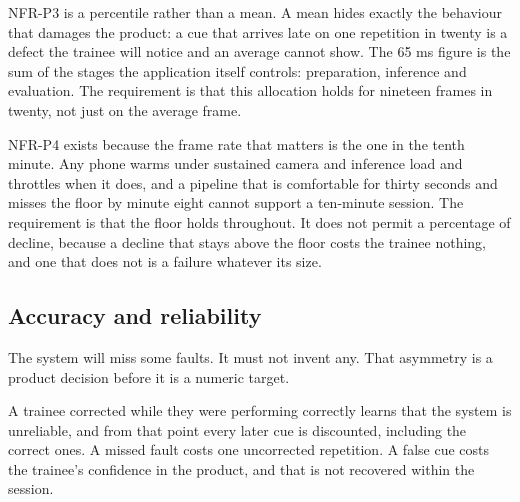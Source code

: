 NFR-P3 is a percentile rather than a mean. A mean hides exactly the behaviour that damages the product: a cue that arrives late on one repetition in twenty is a defect the trainee will notice and an average cannot show. The 65 ms figure is the sum of the stages the application itself controls: preparation, inference and evaluation. The requirement is that this allocation holds for nineteen frames in twenty, not just on the average frame.

NFR-P4 exists because the frame rate that matters is the one in the tenth minute. Any phone warms under sustained camera and inference load and throttles when it does, and a pipeline that is comfortable for thirty seconds and misses the floor by minute eight cannot support a ten-minute session. The requirement is that the floor holds throughout. It does not permit a percentage of decline, because a decline that stays above the floor costs the trainee nothing, and one that does not is a failure whatever its size.

\subsection{Accuracy and reliability}
\label{sec:3.4.3}

The system will miss some faults. It must not invent any. That asymmetry is a product decision before it is a numeric target.

A trainee corrected while they were performing correctly learns that the system is unreliable, and from that point every later cue is discounted, including the correct ones. A missed fault costs one uncorrected repetition. A false cue costs the trainee's confidence in the product, and that is not recovered within the session.

